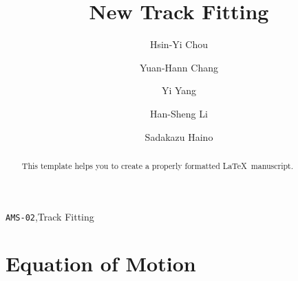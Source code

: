 \documentclass[review]{elsarticle}
\begin{document}
\begin{frontmatter}

    \title{New Track Fitting}

    \author[add1]{Hsin-Yi Chou}
    \author[add1]{Yuan-Hann Chang}
    \author[add2]{Yi Yang}
    \author[add2]{Han-Sheng Li}
    \author[add3]{Sadakazu Haino}
    \address[add1]{National Central University, Chung–Li, Tao Yuan 32054, Taiwan}
    \address[add2]{National Cheng Kung University, Tainan 70101, Taiwan}
    \address[add3]{Institute of Physics, Academia Sinica, Nankang, Taipei 11529, Taiwan}

    \begin{abstract}
        This template helps you to create a properly formatted \LaTeX\ manuscript.
    \end{abstract}

    \begin{keyword}
        \texttt{AMS-02}\sep  Track Fitting
    \end{keyword}

\end{frontmatter}

\linenumbers

\section{Equation of Motion}
\end{document}
